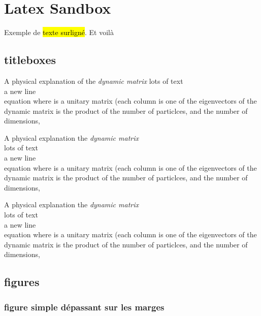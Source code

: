 %
\chapter{Latex Sandbox}
\label{ch:latex_sandbox}

Exemple de \hl{texte surligné}. Et voilà


\section*{titleboxes}

\begin{titlebox}{A physical explanation of the \emph{dynamic matrix}}
lots of text\\
a new line\\
equation
where  is a unitary matrix (each column is one of the eigenvectors of the dynamic matrix is the product of the number of particlces, and the number of dimensions,
\end{titlebox}

\begin{notebox}
A physical explanation the \emph{dynamic matrix}\\
lots of text\\
a new line\\
equation
where  is a unitary matrix (each column is one of the eigenvectors of the dynamic matrix is the product of the number of particlces, and the number of dimensions,
\end{notebox}

\begin{notebox}
A physical explanation the \emph{dynamic matrix}\\
lots of text\\
a new line\\
equation
where  is a unitary matrix (each column is one of the eigenvectors of the dynamic matrix is the product of the number of particlces, and the number of dimensions,
\end{notebox}

\Pierre{\blindtext}

\section*{figures}

\subsection*{figure simple dépassant sur les marges}

